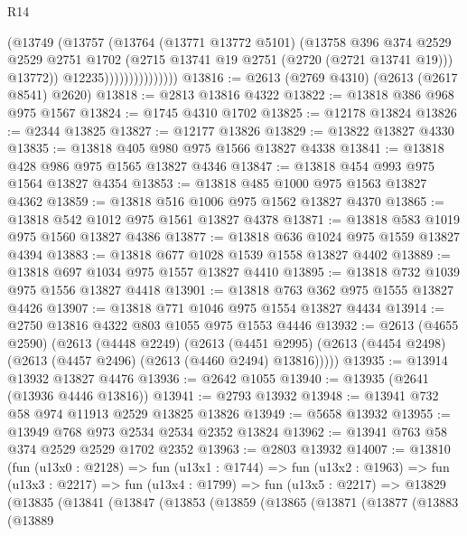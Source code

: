 \begin{lexlean}{R14}
\begin{coremodule}
                              (@13749
                                (@13757
                                  (@13764
                                    (@13771 @13772 @5101)
                                    (@13758
                                      @396
                                      @374
                                      @2529
                                      @2529
                                      @2751
                                      @1702
                                      (@2715 @13741 @19 @2751 (@2720 (@2721 @13741 @19)))
                                      @13772))
                                  @12235)))))))))))))))
@13816 := @2613 (@2769 @4310) (@2613 (@2617 @8541) @2620)
@13818 := @2813 @13816 @4322
@13822 := @13818 @386 @968 @975 @1567
@13824 := @1745 @4310 @1702
@13825 := @12178 @13824
@13826 := @2344 @13825
@13827 := @12177 @13826
@13829 := @13822 @13827 @4330
@13835 := @13818 @405 @980 @975 @1566 @13827 @4338
@13841 := @13818 @428 @986 @975 @1565 @13827 @4346
@13847 := @13818 @454 @993 @975 @1564 @13827 @4354
@13853 := @13818 @485 @1000 @975 @1563 @13827 @4362
@13859 := @13818 @516 @1006 @975 @1562 @13827 @4370
@13865 := @13818 @542 @1012 @975 @1561 @13827 @4378
@13871 := @13818 @583 @1019 @975 @1560 @13827 @4386
@13877 := @13818 @636 @1024 @975 @1559 @13827 @4394
@13883 := @13818 @677 @1028 @1539 @1558 @13827 @4402
@13889 := @13818 @697 @1034 @975 @1557 @13827 @4410
@13895 := @13818 @732 @1039 @975 @1556 @13827 @4418
@13901 := @13818 @763 @362 @975 @1555 @13827 @4426
@13907 := @13818 @771 @1046 @975 @1554 @13827 @4434
@13914 := @2750 @13816 @4322 @803 @1055 @975 @1553 @4446
@13932 := @2613
    (@4655 @2590)
    (@2613
      (@4448 @2249)
      (@2613
        (@4451 @2995)
        (@2613 (@4454 @2498) (@2613 (@4457 @2496) (@2613 (@4460 @2494) @13816)))))
@13935 := @13914 @13932 @13827 @4476
@13936 := @2642 @1055
@13940 := @13935 (@2641 (@13936 @4446 @13816))
@13941 := @2793 @13932
@13948 := @13941 @732 @58 @974 @11913 @2529 @13825 @13826
@13949 := @5658 @13932
@13955 := @13949 @768 @973 @2534 @2534 @2352 @13824
@13962 := @13941 @763 @58 @374 @2529 @2529 @1702 @2352
@13963 := @2803 @13932
@14007 := @13810
    (fun (u13x0 : @2128) =>
    fun (u13x1 : @1744) =>
    fun (u13x2 : @1963) =>
    fun (u13x3 : @2217) =>
    fun (u13x4 : @1799) =>
    fun (u13x5 : @2217) =>
    @13829
      (@13835
        (@13841
          (@13847
            (@13853
              (@13859
                (@13865
                  (@13871
                    (@13877
                      (@13883
                        (@13889

\end{coremodule}
\end{lexlean}
